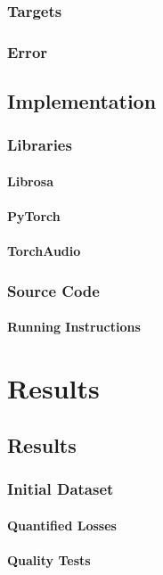 \documentclass{book}
\begin{document}
  \section{Targets}
  \section{Error}

\chapter{Implementation}
  \section{Libraries}
    \subsection{Librosa}
    \subsection{PyTorch}
    \subsection{TorchAudio}
  \section{Source Code}
    \subsection{Running Instructions}


\part{Results}
\chapter{Results}
  \section{Initial Dataset}
    \subsection{Quantified Losses}
    \subsection{Quality Tests}
\end{document}
